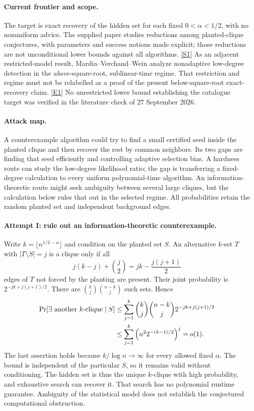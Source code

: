 \documentclass[11pt,a4paper]{article}
\newcommand{\sref}[2]{\hyperlink{source:#1:#2}{[S#2]}}
\newcommand{\eref}[2]{\hyperlink{extra:#1:#2}{[E#2]}}
\numberwithin{equation}{section}
\begin{document}
\paragraph{Current frontier and scope.}
The target is exact recovery of the hidden set for each fixed
$0<\alpha<1/2$, with no nonuniform advice.  The supplied paper studies
reductions among planted-clique conjectures, with parameters and success
notions made explicit; those reductions are not unconditional lower
bounds against all algorithms. \sref{30006743}{1}
As an adjacent restricted-model result, Mardia--Verchand--Wein analyze
nonadaptive low-degree detection in the \emph{above}-square-root,
sublinear-time regime.  That restriction and regime must not be
relabelled as a proof of the present below-square-root exact-recovery
claim. \eref{30006743}{1}  No unrestricted lower bound establishing the
catalogue target was verified in the literature check of
27 September 2026.

\paragraph{Attack map.}
A counterexample algorithm could try to find a small certified seed
inside the planted clique and then recover the rest by common neighbors.
Its two gaps are finding that seed efficiently and controlling adaptive
selection bias.  A hardness route can study the low-degree likelihood
ratio; the gap is transferring a fixed-degree calculation to every
uniform polynomial-time algorithm.  An information-theoretic route
might seek ambiguity between several large cliques, but the calculation
below rules that out in the selected regime.  All probabilities retain
the random planted set and independent background edges.

\paragraph{Attempt I: rule out an information-theoretic counterexample.}
Write $k=\lfloor n^{1/2-\alpha}\rfloor$ and condition on the planted
set $S$.  An alternative $k$-set $T$ with $|T\setminus S|=j$ is a
clique only if all
\[
 j(k-j)+\binom j2=jk-\frac{j(j+1)}2
\]
edges of $T$ not forced by the planting are present.  Their joint
probability is $2^{-jk+j(j+1)/2}$.  There are
$\binom kj\binom{n-k}j$ such sets.  Hence
\begin{align}\label{30006743:unique}
 \Pr[\exists\text{ another $k$-clique}\mid S]
 &\leq\sum_{j=1}^{k}\binom kj\binom{n-k}j
                  2^{-jk+j(j+1)/2}\\
 &\leq\sum_{j=1}^{k}\left(n^2 2^{-(k-1)/2}\right)^j=o(1).\notag
\end{align}
The last assertion holds because $k/\log n\to\infty$ for every
allowed fixed $\alpha$.  The bound is independent of the particular
$S$, so it remains valid without conditioning.  The hidden set is thus
the unique $k$-clique with high probability, and exhaustive search can
recover it.  That search has no polynomial runtime guarantee.
Ambiguity of the statistical model does not establish the conjectured
computational obstruction.
\end{document}
